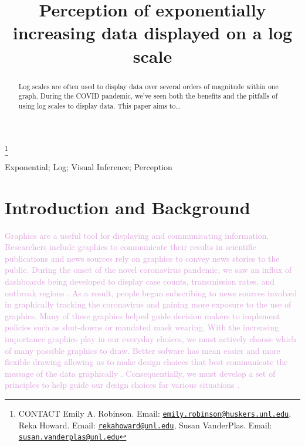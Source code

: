 \documentclass[]{interact}
\theoremstyle{plain}%
\theoremstyle{definition}
\theoremstyle{remark}
\begin{document}

\title{Perception of exponentially increasing data displayed on a log scale}


\author{
}

\thanks{CONTACT Emily A. Robinson. Email: \href{mailto:emily.robinson@huskers.unl.edu}{\nolinkurl{emily.robinson@huskers.unl.edu}}, Reka Howard. Email: \href{mailto:rekahoward@unl.edu}{\nolinkurl{rekahoward@unl.edu}}, Susan VanderPlas. Email: \href{mailto:susan.vanderplas@unl.edu}{\nolinkurl{susan.vanderplas@unl.edu}}}

\maketitle

\begin{abstract}
Log scales are often used to display data over several orders of
magnitude within one graph. During the COVID pandemic, we've seen both
the benefits and the pitfalls of using log scales to display data. This
paper aims to\ldots{}
\end{abstract}

\begin{keywords}
Exponential; Log; Visual Inference; Perception
\end{keywords}

\hypertarget{introduction-and-background}{%
\section{Introduction and
Background}\label{introduction-and-background}}

\textcolor{Plum}{
Graphics are a useful tool for displaying and communicating information. 
Researchers include graphics to communicate their results in scientific publications and news sources rely on graphics to convey news stories to the public. 
During the onset of the novel coronavirus pandemic, we saw an influx of dashboards being developed to display case counts, transmission rates, and outbreak regions \citep{lisa_charlotte_2020}.
As a result, people began subscribing to news sources involved in graphically tracking the coronavirus \citep{rost_2020} and gaining more exposure to the use of graphics. 
Many of these graphics helped guide decision makers to implement policies such as shut-downs or mandated mask wearing. 
With the increasing importance graphics play in our everyday choices, we must actively choose which of many possible graphics to draw. Better sofware has mean easier and more flexible drawing allowing us to make design choices that best communicate the message of the data graphically \citep{unwin_why_2020}. Consequentially, we must develop a set of principles to help guide our design choices for various situations \citep{unwin_why_2020}.
}
\end{document}
